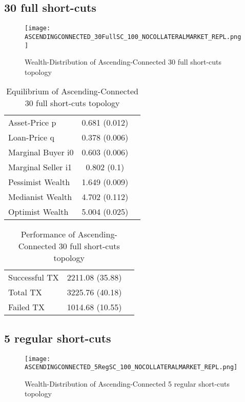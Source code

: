 \documentclass[Bachelorarbeit.tex]{subfiles}
\begin{document}
\subsection{30 full short-cuts}
\begin{figure}[H]
	\centering
  \texttt{[image: ASCENDINGCONNECTED\_30FullSC\_100\_NOCOLLATERALMARKET\_REPL.png]}
	\caption{Wealth-Distribution of Ascending-Connected 30 full short-cuts topology}
	\label{fig:wealth_ASCENDINGCONNECTED_30FullSC_100_NOCOLLATERALMARKET_REPL}
\end{figure}

\begin{table}[H]
	\caption{Equilibrium of Ascending-Connected 30 full short-cuts topology}
	\centering
	\begin{tabular} { l c r }
		\hline
		Asset-Price p & 0.681 (0.012) \\
		Loan-Price q & 0.378 (0.006) \\
		Marginal Buyer i0 & 0.603 (0.006) \\
		Marginal Seller i1 & 0.802 (0.1) \\
		\hline
		Pessimist Wealth & 1.649 (0.009) \\
		Medianist Wealth & 4.702 (0.112) \\
		Optimist Wealth & 5.004 (0.025) \\
		\hline
	\end{tabular}
\end{table} 

\begin{table}[H]
	\caption{Performance of Ascending-Connected 30 full short-cuts topology}
	\centering
	\begin{tabular} { l c r }
		\hline
		Successful TX & 2211.08 (35.88) \\
		Total TX & 3225.76 (40.18) \\
		Failed TX & 1014.68 (10.55) \\
		\hline
	\end{tabular}
\end{table}


\subsection{5 regular short-cuts}
\begin{figure}[H]
	\centering
  \texttt{[image: ASCENDINGCONNECTED\_5RegSC\_100\_NOCOLLATERALMARKET\_REPL.png]}
	\caption{Wealth-Distribution of Ascending-Connected 5 regular short-cuts topology}
	\label{fig:wealth_ASCENDINGCONNECTED_5RegSC_100_NOCOLLATERALMARKET_REPL}
\end{figure}
\end{document}
